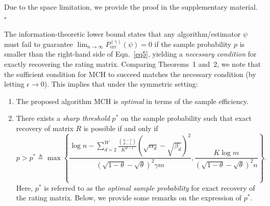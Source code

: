 \documentclass{article}
\newenvironment{proof}{{\noindent\it Proof:}\quad}{\hfill $\square$\par}
\begin{document}
\begin{proof}
    Due to the space limitation, we provide the proof in the supplementary material.
\end{proof}

The information-theoretic lower bound states that any algorithm/estimator $\psi$ must fail to guarantee $\lim_{n \rightarrow \infty }P_{\mathrm{err}}^{(\gamma)}(\psi) = 0$ if the sample probability $p$ is smaller than the right-hand side of Eqn.~\eqref{eq5}, yielding a \emph{necessary condition} for exactly recovering the rating matrix. Comparing Theorems~1 and~2, we note that the sufficient condition for MCH to succeed matches the necessary condition (by letting $\epsilon \to 0$). This implies that under the symmetric setting:
\begin{enumerate}[wide, labelwidth=!, labelindent=0pt]
    \item The proposed algorithm MCH is \emph{optimal} in terms of the sample efficiency.
    \item There exists a \emph{sharp threshold} $p^*$ on the sample probability such that exact recovery of matrix $R$ is possible if and only if 
\begin{equation}\label{eq6}
    p > p^* \triangleq  \max \left\{ \frac{\log n - \sum_{d=2}^{W} \frac{\binom{n-1}{d-1}}{K^{d-1}} (\sqrt{\alpha_d}-\sqrt{\beta_d})^2}{(\sqrt{1-\theta} - \sqrt{\theta})^2 \gamma m}, \frac{ K \log m}{(\sqrt{1-\theta} - \sqrt{\theta})^2 n} \right\}.
\end{equation} 
Here, $p^*$ is referred to as the \emph{optimal sample probability} for exact recovery of the rating matrix. Below, we provide some remarks on the expression of  $p^*$.
\end{enumerate}
\end{document}
